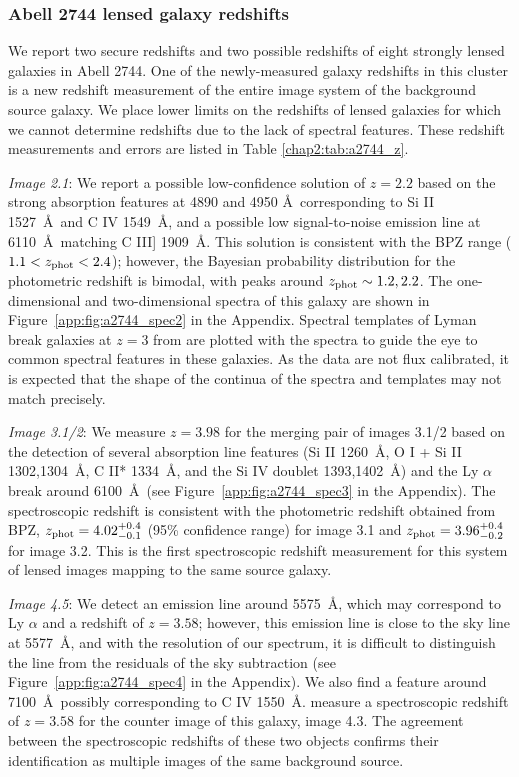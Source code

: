 \subsubsection{Abell 2744 lensed galaxy redshifts}

We report two secure redshifts and two possible redshifts of eight strongly lensed galaxies in Abell 2744. One of the newly-measured galaxy redshifts in this cluster is a new redshift measurement of the entire image system of the background source galaxy. We place lower limits on the redshifts of lensed galaxies for which we cannot determine redshifts due to the lack of spectral features. These redshift measurements and errors are listed in Table \ref{chap2:tab:a2744_z}.

\textit{Image 2.1}: We report a possible low-confidence solution of $z=2.2$ based on the strong absorption features at 4890 and 4950 \AA\ corresponding to Si II 1527~\AA\ and C IV 1549~\AA, and a possible low signal-to-noise emission line at 6110~\AA\ matching C III] 1909~\AA. This solution is consistent with the BPZ range ($1.1<z_\mathrm{phot}<2.4$); however, the Bayesian probability distribution for the photometric redshift is bimodal, with peaks around $z_\mathrm{phot}\sim1.2,2.2$. The one-dimensional and two-dimensional spectra of this galaxy are shown in Figure~\ref{app:fig:a2744_spec2} in the Appendix. Spectral templates of Lyman break galaxies at $z=3$ from \citet{Shapley:2003fk} are plotted with the spectra to guide the eye to common spectral features in these galaxies. As the data are not flux calibrated, it is expected that the shape of the continua of the spectra and templates may not match precisely.

\textit{Image 3.1/2}: We measure $z=3.98$ for the merging pair of images 3.1/2 based on the detection of several absorption line features (Si II 1260~\AA, O I + Si II 1302,1304~\AA, C II* 1334~\AA, and the Si IV doublet 1393,1402~\AA) and the Ly $\alpha$ break around 6100~\AA\ (see Figure~\ref{app:fig:a2744_spec3} in the Appendix). The spectroscopic redshift is consistent with the photometric redshift obtained from BPZ, $z_\mathrm{phot}=4.02^{+0.4}_{-0.1}$ (95\% confidence range) for image 3.1 and $z_\mathrm{phot}=3.96^{+0.4}_{-0.2}$ for image 3.2. This is the first spectroscopic redshift measurement for this system of lensed images mapping to the same source galaxy.

\textit{Image 4.5}: We detect an emission line around 5575~\AA, which may correspond to Ly $\alpha$ and a redshift of $z=3.58$; however, this emission line is close to the sky line at 5577~\AA, and with the resolution of our spectrum, it is difficult to distinguish the line from the residuals of the sky subtraction (see Figure~\ref{app:fig:a2744_spec4} in the Appendix). We also find a feature around 7100~\AA\ possibly corresponding to C IV 1550~\AA.  \citet{Richard:2014gf} measure a spectroscopic redshift of $z=3.58$ for the counter image of this galaxy, image 4.3. The agreement between the spectroscopic redshifts of these two objects confirms their identification as multiple images of the same background source.

